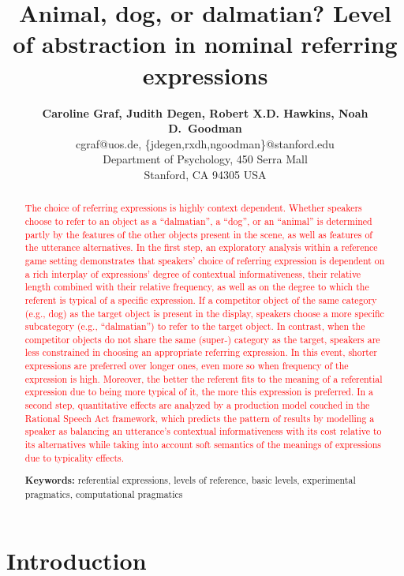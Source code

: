 \documentclass[10pt,letterpaper]{article}
\title{Animal, dog, or dalmatian? Level of abstraction in nominal referring expressions}
\author{{\large \bf Caroline Graf, Judith Degen, Robert X.D. Hawkins, Noah D.~Goodman} \\
  cgraf@uos.de, \{jdegen,rxdh,ngoodman\}@stanford.edu\\
  Department of Psychology, 450 Serra Mall \\
  Stanford, CA 94305 USA}
\newcommand{\red}[1]{\textcolor{Red}{#1}}
\begin{document}
\maketitle


\begin{abstract}

\red{The choice of referring expressions is highly context dependent. Whether speakers choose to refer to an object as a ``dalmatian'', a ``dog'', or an ``animal'' is determined partly by the features of the other objects present in the scene, as well as features of the utterance alternatives. In the first step, an exploratory analysis within a reference game setting demonstrates that speakers' choice of referring expression is dependent on a rich interplay of expressions' degree of contextual informativeness, their relative length combined with their relative frequency, as well as on the degree to which the referent is typical of a specific expression. If a competitor object of the same category (e.g., dog) as the target object is present in the display, speakers choose a more specific subcategory (e.g., ``dalmatian'') to refer to the target object. In contrast, when the competitor objects do not share the same (super-) category as the target, speakers are less constrained in choosing an appropriate referring expression. In this event, shorter expressions are preferred over longer ones, even more so when frequency of the expression is high. Moreover, the better the referent fits to the meaning of a referential expression due to being more typical of it, the more this expression is preferred. In a second step, quantitative effects are analyzed by a production model couched in the Rational Speech Act framework, which predicts the pattern of results by modelling a speaker as balancing an utterance's contextual informativeness with its cost relative to its alternatives while taking into account soft semantics of the meanings of expressions due to typicality effects.}

\textbf{Keywords:} 
referential expressions, levels of reference, basic levels, experimental pragmatics, computational pragmatics
\end{abstract}

\section{\bf Introduction}
\end{document}
